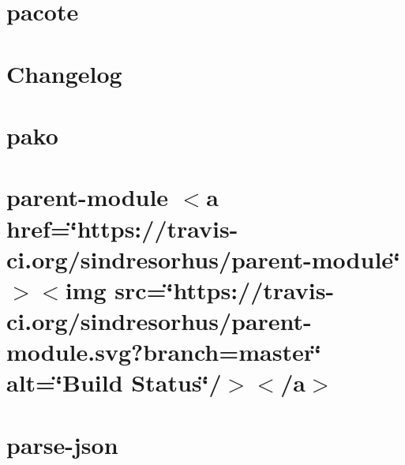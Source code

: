 \documentclass[twoside]{book}
\newcommand{\+}{\discretionary{\mbox{\scriptsize$\hookleftarrow$}}{}{}}
\begin{document}
\chapter{pacote}
\label{md__c___users_vaishnavi_jadhav__desktop__developer_code_mean_stack_example_client_node_modules_pacote__r_e_a_d_m_e}

\chapter{Changelog}
\label{md__c___users_vaishnavi_jadhav__desktop__developer_code_mean_stack_example_client_node_modules_pako__c_h_a_n_g_e_l_o_g}

\chapter{pako}
\label{md__c___users_vaishnavi_jadhav__desktop__developer_code_mean_stack_example_client_node_modules_pako__r_e_a_d_m_e}

\chapter{parent-\/module \texorpdfstring{$<$}{<}a href=\char`\"{}https\+://travis-\/ci.\+org/sindresorhus/parent-\/module\char`\"{} \texorpdfstring{$>$}{>}\texorpdfstring{$<$}{<}img src=\char`\"{}https\+://travis-\/ci.\+org/sindresorhus/parent-\/module.\+svg?branch=master\char`\"{} alt=\char`\"{}\+Build Status\char`\"{}/\texorpdfstring{$>$}{>}\texorpdfstring{$<$}{<}/a\texorpdfstring{$>$}{>}}
\label{md__c___users_vaishnavi_jadhav__desktop__developer_code_mean_stack_example_client_node_modules_parent_module_readme}

\chapter{parse-\/json}
\label{md__c___users_vaishnavi_jadhav__desktop__developer_code_mean_stack_example_client_node_modules_parse_json_readme}

\end{document}
